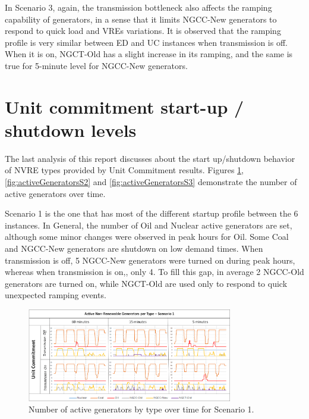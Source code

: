\documentclass[12pt,LUDisStyle,twosided]{book}
\begin{document}
In Scenario 3, again, the transmission bottleneck also affects the ramping capability of generators, in a sense that it limits NGCC-New generators to respond to quick load and VREs variations. It is observed that the ramping profile is very similar between ED and UC instances when transmission is off. When it is on, NGCT-Old has a slight increase in its ramping, and the same is true for 5-minute level for NGCC-New generators. 

\section{Unit commitment start-up / shutdown levels} \label{section:uconoffstatus}

The last analysis of this report discusses about the start up/shutdown behavior of NVRE types provided by Unit Commitment results. Figures \ref{fig:activeGeneratorsS1}, \ref{fig:activeGeneratorsS2} and \ref{fig:activeGeneratorsS3} demonstrate the number of active generators over time.

Scenario 1 is the one that has most of the different startup profile between the 6 instances. In General, the number of Oil and Nuclear active generators are set, although some minor changes were observed in peak hours for Oil. Some Coal and NGCC-New generators are shutdown on low demand times. When transmission is off, 5 NGCC-New generators were turned on during peak hours, whereas when transmission is on,, only 4. To fill this gap, in average 2 NGCC-Old generators are turned on, while NGCT-Old are used only to respond to quick unexpected ramping events.

\begin{figure}[H] 
  \centering
  
	  \includegraphics[width=0.8\textwidth,keepaspectratio]{activeGeneratorsS1.png}
  
  \caption{Number of active generators by type over time for Scenario 1.}
  \label{fig:activeGeneratorsS1}
  \end{figure}
  
\end{document}
